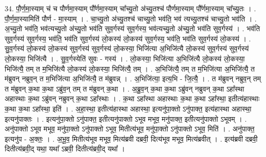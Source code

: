 \documentclass[17pt]{extarticle}
\begin{document}
34. पौ॒र्ण॒मा॒स्याम् च॑ च पौर्णमा॒स्याम् पौ᳚र्णमा॒स्याम् चा᳚च्यु॒तो अ॑च्यु॒तश्च॑ पौर्णमा॒स्याम् पौ᳚र्णमा॒स्याम् चा᳚च्यु॒तः । . पौ॒र्ण॒मा॒स्यामिति॑ पौर्ण - मा॒स्याम् । . चा॒च्यु॒तो अ॑च्यु॒तश्च॑ चाच्यु॒तो भव॑ति॒ भव॑ त्यच्यु॒तश्च॑ चाच्यु॒तो भव॑ति । . अ॒च्यु॒तो भव॑ति॒ भव॑त्यच्यु॒तो अ॑च्यु॒तो भव॑ति सुव॒र्गस्य॑ सुव॒र्गस्य॒ भव॑त्यच्यु॒तो अ॑च्यु॒तो भव॑ति सुव॒र्गस्य॑ । . भव॑ति सुव॒र्गस्य॑ सुव॒र्गस्य॒ भव॑ति॒ भव॑ति सुव॒र्गस्य॑ लो॒कस्य॑ लो॒कस्य॑ सुव॒र्गस्य॒ भव॑ति॒ भव॑ति सुव॒र्गस्य॑ लो॒कस्य॑ । . सु॒व॒र्गस्य॑ लो॒कस्य॑ लो॒कस्य॑ सुव॒र्गस्य॑ सुव॒र्गस्य॑ लो॒कस्या॒ भिजि॑त्या अ॒भिजि॑त्यै लो॒कस्य॑ सुव॒र्गस्य॑ सुव॒र्गस्य॑ लो॒कस्या॒ भिजि॑त्यै । . सु॒व॒र्गस्येति॑ सुवः - गस्य॑ । . लो॒कस्या॒ भिजि॑त्या अ॒भिजि॑त्यै लो॒कस्य॑ लो॒कस्या॒ भिजि॑त्यै॒ तम् त म॒भिजि॑त्यै लो॒कस्य॑ लो॒कस्या॒ भिजि॑त्यै॒ तम् । . अ॒भिजि॑त्यै॒ तम् त म॒भिजि॑त्या अ॒भिजि॑त्यै॒ त म॑ब्रुवन् नब्रुव॒न् त म॒भिजि॑त्या अ॒भिजि॑त्यै॒ त म॑ब्रुवन्न् । . अ॒भिजि॑त्या॒ इत्य॒भि - जि॒त्यै॒ । . त म॑ब्रुवन् नब्रुव॒न् तम् त म॑ब्रुवन् क॒था क॒था ऽब्रु॑व॒न् तम् त म॑ब्रुवन् क॒था । . अ॒ब्रु॒व॒न् क॒था क॒था ऽब्रु॑वन् नब्रुवन् क॒था ऽहा᳚स्था अहास्थाः क॒था ऽब्रु॑वन् नब्रुवन् क॒था ऽहा᳚स्थाः । . क॒था ऽहा᳚स्था अहास्थाः क॒था क॒था ऽहा᳚स्था॒ इतीत्य॑हास्थाः क॒था क॒था ऽहा᳚स्था॒ इति॑ । . अ॒हा॒स्था॒ इतीत्य॑हास्था अहास्था॒ इत्यनु॑पा॒क्तो ऽनु॑पाक्त॒ इत्य॑हास्था अहास्था॒ इत्यनु॑पाक्तः । . इत्यनु॑पा॒क्तो ऽनु॑पाक्त॒ इतीत्यनु॑पाक्तो ऽभूव मभूव॒ मनु॑पाक्त॒ इतीत्यनु॑पाक्तो ऽभूवम् । . अनु॑पाक्तो ऽभूव मभूव॒ मनु॑पा॒क्तो ऽनु॑पाक्तो ऽभूव॒ मितीत्य॑भूव॒ मनु॑पा॒क्तो ऽनु॑पाक्तो ऽभूव॒ मिति॑ । . अनु॑पाक्त॒ इत्यनु॑प - अ॒क्तः॒ । . अ॒भू॒व॒ मितीत्य॑भूव मभूव॒ मित्य॑ब्रवी दब्रवी॒ दित्य॑भूव मभूव॒ मित्य॑ब्रवीत् । . इत्य॑ब्रवी दब्रवी॒ दितीत्य॑ब्रवी॒द् यथा॒ यथा᳚ ऽब्रवी॒ दितीत्य॑ब्रवी॒द् यथा᳚ । \newline
\end{document}
